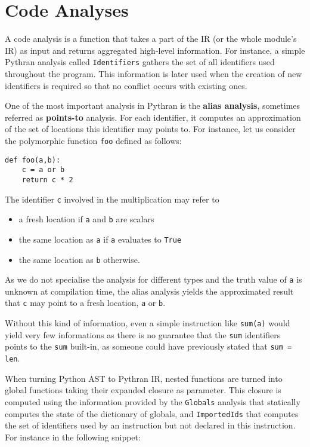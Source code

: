 \documentclass[10pt, onecolumn, preprint]{sigplanconf}
\begin{document}
\section{Code Analyses}
\label{sec:analysis}

A code analysis is a function that takes a part of the IR (or the whole
module's IR) as input and returns aggregated high-level information. For
instance, a simple Pythran analysis called \texttt{Identifiers} gathers the set
of all identifiers used throughout the program. This information is later used
when the creation of new identifiers is required so that no conflict occurs
with existing ones.

One of the most important analysis in Pythran is the \textbf{alias analysis}, sometimes
referred as \textbf{points-to} analysis. For each identifier, it computes an
approximation of the set of locations this identifier may points to. For
instance, let us consider the polymorphic function \texttt{foo} defined as follows:

\begin{lstlisting}
def foo(a,b):
    c = a or b
    return c * 2
\end{lstlisting}

The identifier \texttt{c} involved in the multiplication may refer to

\begin{itemize}
    \item a fresh location if \texttt{a} and \texttt{b} are scalars

    \item the same location as \texttt{a} if \texttt{a} evaluates to \texttt{True}

    \item the same location as \texttt{b} otherwise.

\end{itemize}

As we do not specialise the analysis for different types and the truth value of
\texttt{a} is unknown at compilation time, the alias analysis yields the approximated
result that \texttt{c} may point to a fresh location, \texttt{a} or \texttt{b}.

Without this kind of information, even a simple instruction like
\texttt{sum(a)} would yield very few informations as there is no guarantee that
the \texttt{sum} identifiers points to the \texttt{sum} built-in, as someone
could have previously stated that \texttt{sum = len}.

When turning Python AST to Pythran IR, nested functions are turned into global
functions taking their expanded closure as parameter. This closure is computed using the
information provided by the \texttt{Globals} analysis that statically computes the
state of the dictionary of globals, and \texttt{ImportedIds} that computes the set of
identifiers used by an instruction but not declared in this instruction. For
instance in the following snippet:
\end{document}

